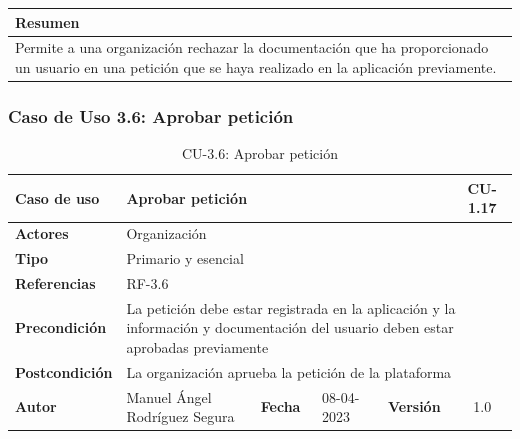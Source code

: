 \begin{table}[H]
    \centering
    \begin{tabularx}{\textwidth}{@{} |L |@{}} \hline
        \textbf{Resumen} \\
        \hline
        Permite a una organización rechazar la documentación que ha proporcionado un usuario en una petición que se haya
    realizado en la aplicación previamente. \\
        \hline
    \end{tabularx}
\end{table}

\subsubsection{Caso de Uso 3.6: Aprobar petición}\label{subsubsec:aprobar-peticion}

\begin{table}[H]
    \begin{center}
        \begin{adjustbox}{width=\textwidth}
            \begin{tabular}{ | l | l | l | l | c | c | }
                \hline
                \textbf{Caso de uso} & \multicolumn{4}{l|}{Aprobar petición} & \cellcolor{gray!50} \textbf{CU-1.17}\\
                \hline
                \textbf{Actores} & \multicolumn{5}{p{0.5\linewidth}|}{Organización} \\
                \hline
                \textbf{Tipo} & \multicolumn{5}{l|}{Primario y esencial} \\
                \hline
                \textbf{Referencias} & \multicolumn{3}{l|}{RF-3.6} & \multicolumn{2}{l|}{ }\\
                \hline
                \textbf{Precondición} & \multicolumn{5}{l|}{La petición debe estar registrada en la aplicación y
                la información y documentación del usuario deben estar aprobadas previamente} \\
                \hline
                \textbf{Postcondición} & \multicolumn{5}{l|}{La organización aprueba la petición de la plataforma} \\
                \hline
                \textbf{Autor} & \multicolumn{1}{p{0.25\linewidth}|}{Manuel Ángel Rodríguez Segura} & \textbf{Fecha} &
                08-04-2023     & \textbf{Versión}                                                      & 1.0\\
                \hline
            \end{tabular}
        \end{adjustbox}
        \caption{CU-3.6: Aprobar petición}
        \label{tab:aprobar-peticion}
    \end{center}
\end{table}

